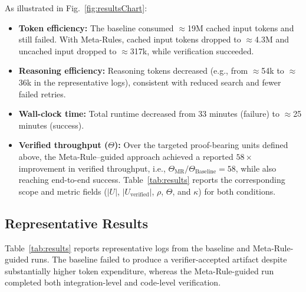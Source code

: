 \documentclass[conference]{IEEEtran}
\begin{document}
As illustrated in Fig.~\ref{fig:resultsChart}:
\begin{itemize}
    \item \textbf{Token efficiency:} The baseline consumed $\approx$19M cached input tokens and still failed. With Meta-Rules, cached input tokens dropped to $\approx$4.3M and uncached input dropped to $\approx$317k, while verification succeeded.
    \item \textbf{Reasoning efficiency:} Reasoning tokens decreased (e.g., from $\approx$54k to $\approx$36k in the representative logs), consistent with reduced search and fewer failed retries.
    \item \textbf{Wall-clock time:} Total runtime decreased from 33 minutes (failure) to $\approx$25 minutes (success).
    \item \textbf{Verified throughput ($\Theta$):} Over the targeted proof-bearing units defined above, the Meta-Rule--guided approach achieved a reported $58\times$ improvement in verified throughput, i.e., $\Theta_{\mathrm{MR}} / \Theta_{\mathrm{Baseline}} = 58$, while also reaching end-to-end success. Table~\ref{tab:results} reports the corresponding scope and metric fields ($|U|$, $|U_{\mathrm{verified}}|$, $\rho$, $\Theta$, and $\kappa$) for both conditions.~\cite{slides}
\end{itemize}
\subsection{Representative Results}
Table~\ref{tab:results} reports representative logs from the baseline and Meta-Rule-guided runs. The baseline failed to produce a verifier-accepted artifact despite substantially higher token expenditure, whereas the Meta-Rule-guided run completed both integration-level and code-level verification.
\end{document}
